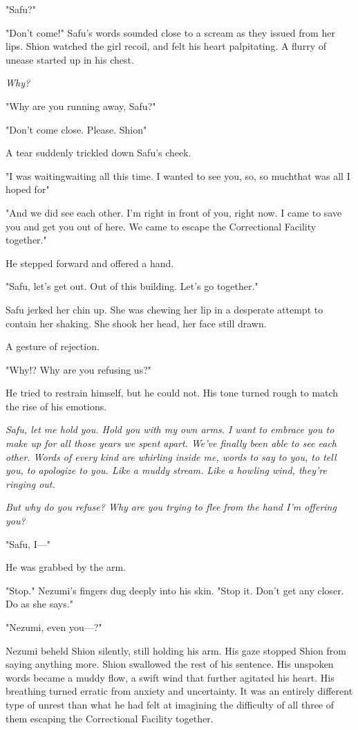 "Safu?"

"Don't come!" Safu's words sounded close to a scream as they issued from
her lips. Shion watched the girl recoil, and felt his heart palpitating.
A flurry of unease started up in his chest.

\emph{Why?}

"Why are you running away, Safu?"

"Don't come close. Please. Shion\el "

A tear suddenly trickled down Safu's cheek.

"I was waiting\el waiting all this time. I wanted to see you, so, so
much\el that was all I hoped for\el "

"And we did see each other. I'm right in front of you, right now. I came
to save you and get you out of here. We came to escape the Correctional
Facility together."

He stepped forward and offered a hand.

"Safu, let's get out. Out of this building. Let's go together."

Safu jerked her chin up. She was chewing her lip in a desperate attempt
to contain her shaking. She shook her head, her face still drawn.

A gesture of rejection.

"Why!? Why are you refusing us?"

He tried to restrain himself, but he could not. His tone turned rough to
match the rise of his emotions.

\emph{Safu, let me hold you. Hold you with my own arms. I want to embrace you
to make up for all those years we spent apart. We've finally been able
to see each other. Words of every kind are whirling inside me, words to
say to you, to tell you, to apologize to you. Like a muddy stream. Like
a howling wind, they're ringing out.}

\emph{But why do you refuse? Why are you trying to flee from the hand I'm
offering you?}

"Safu, I---"

He was grabbed by the arm.

"Stop." Nezumi's fingers dug deeply into his skin. "Stop it. Don't get
any closer. Do as she says."

"Nezumi, even you---?"

Nezumi beheld Shion silently, still holding his arm. His gaze stopped
Shion from saying anything more. Shion swallowed the rest of his
sentence. His unspoken words became a muddy flow, a swift wind that
further agitated his heart. His breathing turned erratic from anxiety
and uncertainty. It was an entirely different type of unrest than what
he had felt at imagining the difficulty of all three of them escaping
the Correctional Facility together.

